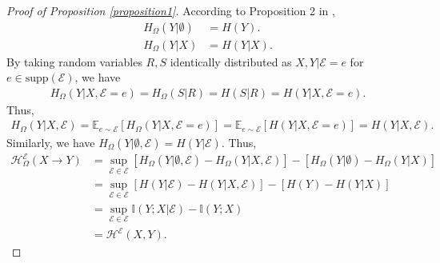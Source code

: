 \begin{proof}[Proof of Proposition \ref{proposition1}]
According to Proposition 2 in \cite{DBLP:conf/iclr/XuZSSE20}, 
\begin{align}
    H_\Omega(Y|\emptyset) &= H(Y). \\
    H_\Omega(Y|X) &= H(Y|X).
\end{align}
By taking random variables $R,S$ identically distributed as $X,Y|\mathcal E=e$ for $e \in \text{supp}(\mathcal E)$, we have
\begin{align}
    H_{\Omega}(Y|X,\mathcal E=e) = H_{\Omega}(S|R) = H(S|R) = H(Y|X,\mathcal E=e).
\end{align}
Thus, 
\begin{align}
    H_\Omega(Y|X,\mathcal E) = \mathbb E_{e\sim \mathcal E}[H_\Omega(Y|X,\mathcal E=e)] = \mathbb E_{e\sim \mathcal E}[H(Y|X,\mathcal E=e)] = H(Y|X,\mathcal E).
\end{align}
Similarly, we have $ H_\Omega(Y|\emptyset,\mathcal E) = H(Y|\mathcal E)$.
Thus,
\begin{align}
    \mathcal{H}^{\mathscr E}_{\Omega}(X \rightarrow Y) &= 
    \sup_{\mathcal{E} \in \mathscr E} \left[H_\Omega(Y|\emptyset,\mathcal E) - H_\Omega(Y|X,\mathcal E)\right] - \left[H_\Omega(Y|\emptyset) - H_\Omega(Y|X)\right] \\
    &=  \sup_{\mathcal{E} \in \mathscr E} \left[H(Y|\mathcal E) - H(Y|X,\mathcal E)\right] - \left[H(Y) - H(Y|X)\right] \\
    &= \sup_{\mathcal{E} \in \mathscr E}\mathbb{I}(Y;X|\mathcal{E})-\mathbb{I}(Y;X) \\
    &= \mathcal{H}^{\mathscr E}(X, Y).
\end{align}
\end{proof}




